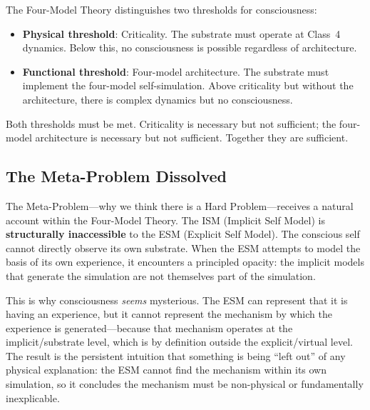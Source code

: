 \documentclass[12pt]{article}
\begin{document}
The Four-Model Theory distinguishes two thresholds for consciousness:
\begin{itemize}
\item \textbf{Physical threshold}: Criticality. The substrate must operate at Class~4 dynamics. Below this, no consciousness is possible regardless of architecture.
\item \textbf{Functional threshold}: Four-model architecture. The substrate must implement the four-model self-simulation. Above criticality but without the architecture, there is complex dynamics but no consciousness.
\end{itemize}

Both thresholds must be met. Criticality is necessary but not sufficient; the four-model architecture is necessary but not sufficient. Together they are sufficient.


\subsection{The Meta-Problem Dissolved}

The Meta-Problem---\hspace{0pt}why we think there is a Hard Problem---\hspace{0pt}receives a natural account within the Four-Model Theory. The ISM (Implicit Self Model) is \textbf{structurally inaccessible} to the ESM (Explicit Self Model). The conscious self cannot directly observe its own substrate. When the ESM attempts to model the basis of its own experience, it encounters a principled opacity: the implicit models that generate the simulation are not themselves part of the simulation.

This is why consciousness \emph{seems} mysterious. The ESM can represent that it is having an experience, but it cannot represent the mechanism by which the experience is generated---\hspace{0pt}because that mechanism operates at the implicit/substrate level, which is by definition outside the explicit/virtual level. The result is the persistent intuition that something is being ``left out'' of any physical explanation: the ESM cannot find the mechanism within its own simulation, so it concludes the mechanism must be non-physical or fundamentally inexplicable.
\end{document}
